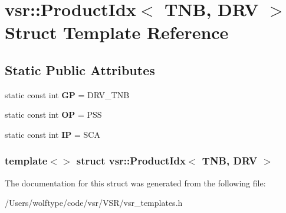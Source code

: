 \hypertarget{structvsr_1_1_product_idx_3_01_t_n_b_00_01_d_r_v_01_4}{\section{vsr\-:\-:Product\-Idx$<$ T\-N\-B, D\-R\-V $>$ Struct Template Reference}
\label{structvsr_1_1_product_idx_3_01_t_n_b_00_01_d_r_v_01_4}
}
\subsection*{Static Public Attributes}
\begin{DoxyCompactItemize}
\item 
\hypertarget{structvsr_1_1_product_idx_3_01_t_n_b_00_01_d_r_v_01_4_a0e3457ed519eae15731e59b1670705ca}{static const int {\bfseries G\-P} = D\-R\-V\-\_\-\-T\-N\-B}\label{structvsr_1_1_product_idx_3_01_t_n_b_00_01_d_r_v_01_4_a0e3457ed519eae15731e59b1670705ca}

\item 
\hypertarget{structvsr_1_1_product_idx_3_01_t_n_b_00_01_d_r_v_01_4_ac40c937eb0c38bb201772ceb419430f4}{static const int {\bfseries O\-P} = P\-S\-S}\label{structvsr_1_1_product_idx_3_01_t_n_b_00_01_d_r_v_01_4_ac40c937eb0c38bb201772ceb419430f4}

\item 
\hypertarget{structvsr_1_1_product_idx_3_01_t_n_b_00_01_d_r_v_01_4_ab004140e4b38d3bb48b561bc1f408d4b}{static const int {\bfseries I\-P} = S\-C\-A}\label{structvsr_1_1_product_idx_3_01_t_n_b_00_01_d_r_v_01_4_ab004140e4b38d3bb48b561bc1f408d4b}

\end{DoxyCompactItemize}
\subsubsection*{template$<$$>$ struct vsr\-::\-Product\-Idx$<$ T\-N\-B, D\-R\-V $>$}



The documentation for this struct was generated from the following file\-:\begin{DoxyCompactItemize}
\item 
/\-Users/wolftype/code/vsr/\-V\-S\-R/vsr\-\_\-templates.\-h\end{DoxyCompactItemize}
